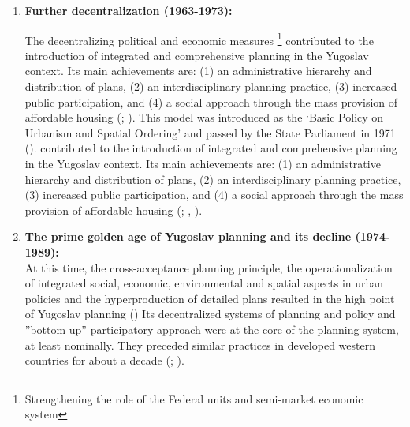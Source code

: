 \documentclass[11pt]{report}
\begin{document}
\begin{enumerate}
\item \textbf{Further decentralization (1963-1973):}

The decentralizing political and economic measures
\footnote{Strengthening the role of the Federal units and semi-market economic system}
contributed to the introduction of integrated and comprehensive planning in the Yugoslav context. Its main achievements are: (1) an administrative hierarchy and distribution of plans, (2) an interdisciplinary planning practice, (3) increased public participation, and (4) a social approach through the mass provision of affordable housing (\href{Vesna}{\citealt{cagic_zakoni_2014}}; \href{Peric}{ \citealt{peric_evolution_2016}}). This model was introduced as the ‘Basic Policy on Urbanism and Spatial Ordering’ and passed by the State Parliament in 1971 (\href{Nedovic}{\citealt{nedovicbudic_waves_2006}}).
contributed to the introduction of integrated and comprehensive planning in the Yugoslav context. Its main achievements are: (1) an administrative hierarchy and distribution of plans, (2) an interdisciplinary planning practice, (3) increased public participation, and (4) a social approach through the mass provision of affordable housing (\href{Simmie}{\citealt{simmie_self-management_1989}}; \href{Vujosevic}{\citealt{vujosevic_planiranje_2003}}, \href{Peric}{\citealt{peric_evolution_2016}}).

\item \textbf{The prime golden age of Yugoslav planning and its decline (1974-1989):}
\\
At this  time, the cross-acceptance  planning  principle, the  operationalization  of  integrated social,  economic, environmental and spatial aspects in urban policies and the hyperproduction of detailed plans resulted in the high point of Yugoslav planning (\href{Nedovic}{\citealt{nedovic-budic_mornings_2011}})
Its decentralized systems of planning and policy and ”bottom-up” participatory approach were at the core of the planning system, at least nominally. They preceded similar practices in developed western countries for about a decade (\href{Cullingworth}{\citealt{cullingworth_planning_1997}}; \href{Vujosevic} {\citealt{vujosevic_collapse_2010}}).
\\


\end{enumerate}
\end{document}
